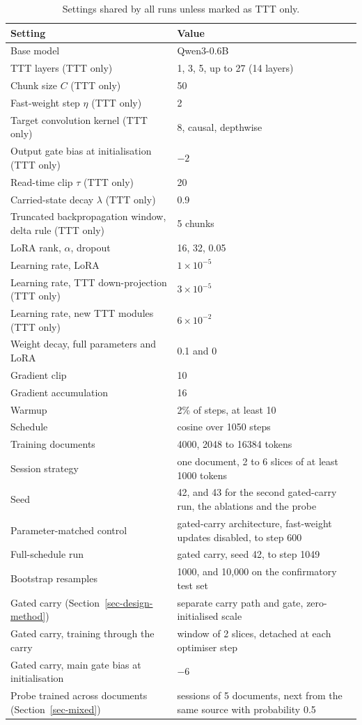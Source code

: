 \documentclass[12pt,a4paper]{report}
\begin{document}
\begin{table}[H]
  \centering
  \small
  \caption{Settings shared by all runs unless marked as TTT only.}
  \begin{tabular}{ll}
    \toprule
    Setting & Value \\
    \midrule
    Base model & Qwen3-0.6B \\
    TTT layers (TTT only) & 1, 3, 5, up to 27 (14 layers) \\
    Chunk size $C$ (TTT only) & 50 \\
    Fast-weight step $\eta$ (TTT only) & 2 \\
    Target convolution kernel (TTT only) & 8, causal, depthwise \\
    Output gate bias at initialisation (TTT only) & $-2$ \\
    Read-time clip $\tau$ (TTT only) & 20 \\
    Carried-state decay $\lambda$ (TTT only) & 0.9 \\
    Truncated backpropagation window, delta rule (TTT only) & 5 chunks \\
    LoRA rank, $\alpha$, dropout & 16, 32, 0.05 \\
    Learning rate, LoRA & $1 \times 10^{-5}$ \\
    Learning rate, TTT down-projection (TTT only) & $3 \times 10^{-5}$ \\
    Learning rate, new TTT modules (TTT only) & $6 \times 10^{-2}$ \\
    Weight decay, full parameters and LoRA & 0.1 and 0 \\
    Gradient clip & 10 \\
    Gradient accumulation & 16 \\
    Warmup & 2\% of steps, at least 10 \\
    Schedule & cosine over 1050 steps \\
    Training documents & 4000, 2048 to 16384 tokens \\
    Session strategy & one document, 2 to 6 slices of at least 1000 tokens \\
    Seed & 42, and 43 for the second gated-carry run, the ablations and the probe \\
    Parameter-matched control & gated-carry architecture, fast-weight updates disabled, to step 600 \\
    Full-schedule run & gated carry, seed 42, to step 1049 \\
    Bootstrap resamples & 1000, and 10{,}000 on the confirmatory test set \\
    \midrule
    Gated carry (Section~\ref{sec-design-method}) & separate carry path and gate, zero-initialised scale \\
    Gated carry, training through the carry & window of 2 slices, detached at each optimiser step \\
    Gated carry, main gate bias at initialisation & $-6$ \\
    Probe trained across documents (Section~\ref{sec-mixed}) & sessions of 5 documents, next from the same source with probability 0.5 \\
    \bottomrule
  \end{tabular}
\end{table}
\end{document}
